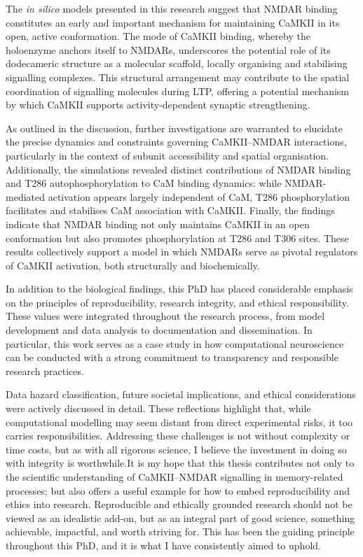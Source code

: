 \documentclass[
  11pt,
  letterpaper,
]{scrreprt}
\begin{document}
The \emph{in silico} models presented in this research suggest that
NMDAR binding constitutes an early and important mechanism for
maintaining CaMKII in its open, active conformation. The mode of CaMKII
binding, whereby the holoenzyme anchors itself to NMDARs, underscores
the potential role of its dodecameric structure as a molecular scaffold,
locally organising and stabilising signalling complexes. This structural
arrangement may contribute to the spatial coordination of signalling
molecules during LTP, offering a potential mechanism by which CaMKII
supports activity-dependent synaptic strengthening.

As outlined in the discussion, further investigations are warranted to
elucidate the precise dynamics and constraints governing CaMKII--NMDAR
interactions, particularly in the context of subunit accessibility and
spatial organisation. Additionally, the simulations revealed distinct
contributions of NMDAR binding and T286 autophosphorylation to CaM
binding dynamics: while NMDAR-mediated activation appears largely
independent of CaM, T286 phosphorylation facilitates and stabilises CaM
association with CaMKII. Finally, the findings indicate that NMDAR
binding not only maintains CaMKII in an open conformation but also
promotes phosphorylation at T286 and T306 sites. These results
collectively support a model in which NMDARs serve as pivotal regulators
of CaMKII activation, both structurally and biochemically.

In addition to the biological findings, this PhD has placed considerable
emphasis on the principles of reproducibility, research integrity, and
ethical responsibility. These values were integrated throughout the
research process, from model development and data analysis to
documentation and dissemination. In particular, this work serves as a
case study in how computational neuroscience can be conducted with a
strong commitment to transparency and responsible research practices.

Data hazard classification, future societal implications, and ethical
considerations were actively discussed in detail. These reflections
highlight that, while computational modelling may seem distant from
direct experimental risks, it too carries responsibilities. Addressing
these challenges is not without complexity or time costs, but as with
all rigorous science, I believe the investment in doing so with
integrity is worthwhile.It is my hope that this thesis contributes not
only to the scientific understanding of CaMKII--NMDAR signalling in
memory-related processes; but also offers a useful example for how to
embed reproducibility and ethics into research. Reproducible and
ethically grounded research should not be viewed as an idealistic
add-on, but as an integral part of good science, something achievable,
impactful, and worth striving for. This has been the guiding principle
throughout this PhD, and it is what I have consistently aimed to uphold.
\end{document}

